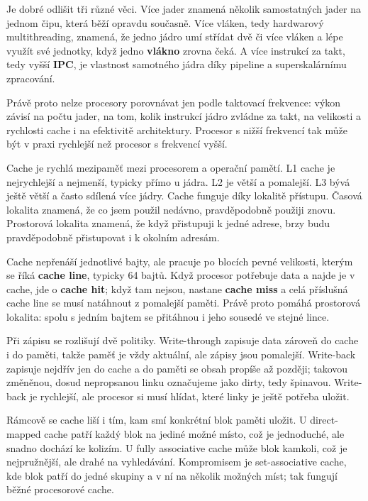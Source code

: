 Je dobré odlišit tři různé věci. Více jader znamená několik samostatných jader na jednom čipu, která běží opravdu současně. Více vláken, tedy hardwarový multithreading, znamená, že jedno jádro umí střídat dvě či více vláken a lépe využít své jednotky, když jedno \textbf{vlákno} zrovna čeká. A více instrukcí za takt, tedy vyšší \textbf{IPC}, je vlastnost samotného jádra díky pipeline a superskalárnímu zpracování.

Právě proto nelze procesory porovnávat jen podle taktovací frekvence: výkon závisí na počtu jader, na tom, kolik instrukcí jádro zvládne za takt, na velikosti a rychlosti cache i na efektivitě architektury. Procesor s nižší frekvencí tak může být v praxi rychlejší než procesor s frekvencí vyšší.

Cache je rychlá mezipaměť mezi procesorem a operační pamětí. L1 cache je nejrychlejší a nejmenší, typicky přímo u jádra. L2 je větší a pomalejší. L3 bývá ještě větší a často sdílená více jádry. Cache funguje díky lokalitě přístupu. Časová lokalita znamená, že co jsem použil nedávno, pravděpodobně použiji znovu. Prostorová lokalita znamená, že když přistupuji k jedné adrese, brzy budu pravděpodobně přistupovat i k okolním adresám.

Cache nepřenáší jednotlivé bajty, ale pracuje po blocích pevné velikosti, kterým se říká \textbf{cache line}, typicky 64 bajtů. Když procesor potřebuje data a najde je v cache, jde o \textbf{cache hit}; když tam nejsou, nastane \textbf{cache miss} a celá příslušná cache line se musí natáhnout z pomalejší paměti. Právě proto pomáhá prostorová lokalita: spolu s jedním bajtem se přitáhnou i jeho sousedé ve stejné lince.

Při zápisu se rozlišují dvě politiky. Write-through zapisuje data zároveň do cache i do paměti, takže paměť je vždy aktuální, ale zápisy jsou pomalejší. Write-back zapisuje nejdřív jen do cache a do paměti se obsah propíše až později; takovou změněnou, dosud nepropsanou linku označujeme jako dirty, tedy špinavou. Write-back je rychlejší, ale procesor si musí hlídat, které linky je ještě potřeba uložit.

Rámcově se cache liší i tím, kam smí konkrétní blok paměti uložit. U direct-mapped cache patří každý blok na jediné možné místo, což je jednoduché, ale snadno dochází ke kolizím. U fully associative cache může blok kamkoli, což je nejpružnější, ale drahé na vyhledávání. Kompromisem je set-associative cache, kde blok patří do jedné skupiny a v ní na několik možných míst; tak fungují běžné procesorové cache.

